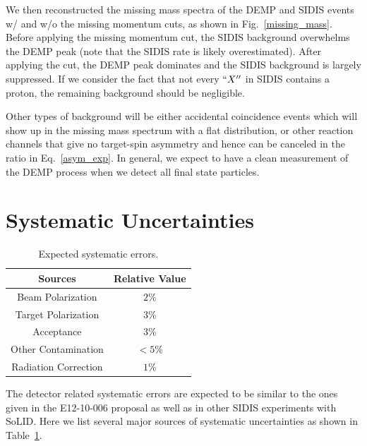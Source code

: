 We then reconstructed the missing mass spectra of the DEMP and SIDIS events w/
and w/o the missing momentum cuts, as shown in Fig.~\ref{missing_mass}. Before
applying the missing momentum cut, the SIDIS background overwhelms the DEMP
peak (note that the SIDIS rate is likely overestimated). After applying the
cut, the DEMP peak dominates and the SIDIS background is largely suppressed. If
we consider the fact that not every $``X''$ in SIDIS contains a proton, the
remaining background should be negligible.

Other types of background will be either accidental coincidence events which
will show up in the missing mass spectrum with a flat distribution, or other
reaction channels that give no target-spin asymmetry and hence can be canceled
in the ratio in Eq.~\ref{asym_exp}. In general, we expect to have a clean
measurement of the DEMP process when we detect all final state particles.

\section{Systematic Uncertainties}
\begin{table}[!htp]
\centering
\begin{tabular}{|c|c|}
\hline
{\bf Sources}            & {\bf Relative Value} \\\hline
Beam Polarization        & $2\%$ \\\hline 
Target Polarization      & $3\%$ \\\hline 
Acceptance               & $3\%$ \\\hline
Other Contamination      & $<5\%$ \\\hline
Radiation Correction     & $1\%$ \\\hline
\end{tabular}
\caption{\footnotesize{Expected systematic errors.}}\label{table:det_sys_err}
\end{table}
The detector related systematic errors are expected to be similar to the ones
given in the E12-10-006 proposal as well as in other SIDIS experiments with
SoLID. Here we list several major sources of systematic uncertainties as shown
in Table~\ref{table:det_sys_err}.
